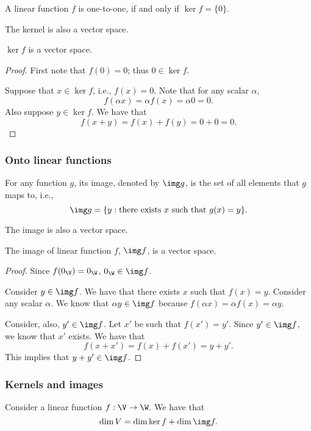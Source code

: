 \begin{frame}
\begin{lemma}
  A linear function $f$ is one-to-one, if and only if $\ker f=\{0\}$.
\end{lemma}

The kernel is also a vector space.

\begin{lemma}
  $\ker f$ is a vector space.
\end{lemma}
\begin{proof}
  First note that $f(0)=0$; thus $0\in\ker f$.

  Suppose that $x\in\ker f$, i.e., $f(x)=0$.  Note that for any scalar
  $\alpha$,
  \[
  f(\alpha x) = \alpha f(x) = \alpha 0 = 0.
  \]
  Also suppose $y\in\ker f$.  We have that
  \[
  f(x+y) = f(x) + f(y) = 0 + 0 = 0.
  \]
\end{proof}
\end{frame}

\begin{frame}
\frametitle{Onto linear functions}

For any function $g$, its image, denoted by $\img g$, is the set of all
elements that $g$ maps to, i.e.,
\[
\img g = \{y : \mbox{there exists $x$ such that $g(x)=y$}\}.
\]

The image is also a vector space.

\begin{lemma}
  The image of linear function $f$, $\img f$, is a vector space.
\end{lemma}
\begin{proof}
  Since $f(0_\V)=0_\W$, $0_\W\in\img f$.

  Consider $y\in\img f$. We have that there exists $x$ such that
  $f(x)=y$.  Consider any scalar $\alpha$.  We know that $\alpha
  y\in\img f$ because $f(\alpha x) = \alpha f(x) =\alpha y$.

  Consider, also, $y'\in\img f$.  Let $x'$ be such that $f(x')=y'$.
  Since $y'\in\img f$, we know that $x'$ exists.  We have that
  \[
  f(x+x')=f(x)+f(x')=y+y'.
  \]
  This implies that $y+y'\in\img f$.
\end{proof}
\end{frame}

\begin{frame}
\frametitle{Kernels and images}

\begin{theorem}
  Consider a linear function $f:\V\rightarrow\W$.  We have that
  \[
  \dim V = \dim\ker f + \dim\img f.
  \]
\end{theorem}
\end{frame}

